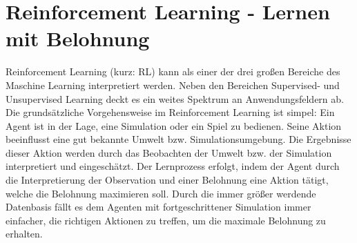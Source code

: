 
\chapter{Reinforcement Learning - Lernen mit Belohnung}
\label{chap:rl}
%

	Reinforcement Learning (kurz: RL) kann als einer der drei großen Bereiche des Maschine Learning interpretiert werden. Neben den Bereichen \glqq Supervised-\grqq{} und \glqq Unsupervised Learning\grqq{} deckt es ein weites Spektrum an Anwendungsfeldern ab.\\
	Die grundsätzliche Vorgehensweise im Reinforcement Learning ist simpel: Ein Agent ist in der Lage, eine Simulation oder ein Spiel zu bedienen. Seine Aktion beeinflusst eine gut bekannte Umwelt bzw. Simulationsumgebung. Die Ergebnisse dieser Aktion werden durch das Beobachten der Umwelt bzw. der Simulation interpretiert und eingeschätzt. Der Lernprozess erfolgt, indem der Agent durch die Interpretierung der Observation und einer Belohnung eine Aktion tätigt, welche die Belohnung maximieren soll. Durch die immer größer werdende Datenbasis fällt es dem Agenten mit fortgeschrittener Simulation immer einfacher, die \glqq richtigen\grqq{} Aktionen zu treffen, um die maximale Belohnung zu erhalten.
	

